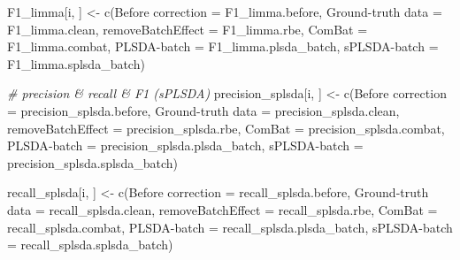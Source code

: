 \documentclass[
]{book}
\newenvironment{Shaded}{\begin{snugshade}}{\end{snugshade}}
\newcommand{\AttributeTok}[1]{\textcolor[rgb]{0.77,0.63,0.00}{#1}}
\newcommand{\CommentTok}[1]{\textcolor[rgb]{0.56,0.35,0.01}{\textit{#1}}}
\newcommand{\FunctionTok}[1]{\textcolor[rgb]{0.00,0.00,0.00}{#1}}
\newcommand{\NormalTok}[1]{#1}
\newcommand{\OtherTok}[1]{\textcolor[rgb]{0.56,0.35,0.01}{#1}}
\newcommand{\StringTok}[1]{\textcolor[rgb]{0.31,0.60,0.02}{#1}}
\begin{document}
\begin{Shaded}
\begin{Highlighting}[]
\NormalTok{  F1\_limma[i, ] }\OtherTok{\textless{}{-}} \FunctionTok{c}\NormalTok{(}\StringTok{\textasciigrave{}}\AttributeTok{Before correction}\StringTok{\textasciigrave{}} \OtherTok{=}\NormalTok{ F1\_limma.before, }
                     \StringTok{\textasciigrave{}}\AttributeTok{Ground{-}truth data}\StringTok{\textasciigrave{}} \OtherTok{=}\NormalTok{ F1\_limma.clean,}
                     \StringTok{\textasciigrave{}}\AttributeTok{removeBatchEffect}\StringTok{\textasciigrave{}} \OtherTok{=}\NormalTok{ F1\_limma.rbe,}
                     \AttributeTok{ComBat =}\NormalTok{ F1\_limma.combat,}
                     \StringTok{\textasciigrave{}}\AttributeTok{PLSDA{-}batch}\StringTok{\textasciigrave{}} \OtherTok{=}\NormalTok{ F1\_limma.plsda\_batch,}
                     \StringTok{\textasciigrave{}}\AttributeTok{sPLSDA{-}batch}\StringTok{\textasciigrave{}} \OtherTok{=}\NormalTok{ F1\_limma.splsda\_batch)}
  
  
  \CommentTok{\# precision \& recall \& F1 (sPLSDA)}
\NormalTok{  precision\_splsda[i, ] }\OtherTok{\textless{}{-}} \FunctionTok{c}\NormalTok{(}\StringTok{\textasciigrave{}}\AttributeTok{Before correction}\StringTok{\textasciigrave{}} \OtherTok{=}\NormalTok{ precision\_splsda.before, }
                             \StringTok{\textasciigrave{}}\AttributeTok{Ground{-}truth data}\StringTok{\textasciigrave{}} \OtherTok{=}\NormalTok{ precision\_splsda.clean,}
                             \StringTok{\textasciigrave{}}\AttributeTok{removeBatchEffect}\StringTok{\textasciigrave{}} \OtherTok{=}\NormalTok{ precision\_splsda.rbe,}
                             \AttributeTok{ComBat =}\NormalTok{ precision\_splsda.combat,}
                             \StringTok{\textasciigrave{}}\AttributeTok{PLSDA{-}batch}\StringTok{\textasciigrave{}} \OtherTok{=}\NormalTok{ precision\_splsda.plsda\_batch,}
                             \StringTok{\textasciigrave{}}\AttributeTok{sPLSDA{-}batch}\StringTok{\textasciigrave{}} \OtherTok{=}\NormalTok{ precision\_splsda.splsda\_batch)}
  
\NormalTok{  recall\_splsda[i, ] }\OtherTok{\textless{}{-}} \FunctionTok{c}\NormalTok{(}\StringTok{\textasciigrave{}}\AttributeTok{Before correction}\StringTok{\textasciigrave{}} \OtherTok{=}\NormalTok{ recall\_splsda.before, }
                          \StringTok{\textasciigrave{}}\AttributeTok{Ground{-}truth data}\StringTok{\textasciigrave{}} \OtherTok{=}\NormalTok{ recall\_splsda.clean,}
                          \StringTok{\textasciigrave{}}\AttributeTok{removeBatchEffect}\StringTok{\textasciigrave{}} \OtherTok{=}\NormalTok{ recall\_splsda.rbe,}
                          \AttributeTok{ComBat =}\NormalTok{ recall\_splsda.combat,}
                          \StringTok{\textasciigrave{}}\AttributeTok{PLSDA{-}batch}\StringTok{\textasciigrave{}} \OtherTok{=}\NormalTok{ recall\_splsda.plsda\_batch,}
                          \StringTok{\textasciigrave{}}\AttributeTok{sPLSDA{-}batch}\StringTok{\textasciigrave{}} \OtherTok{=}\NormalTok{ recall\_splsda.splsda\_batch)}
  

\end{Highlighting}
\end{Shaded}
\end{document}
